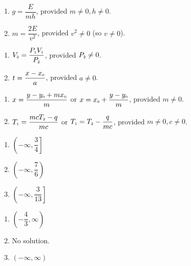\documentclass[11pt]{article}
\theoremstyle{definition}  %
\newcounter{HW}
\begin{document}
\begin{multicols}{2}
\begin{enumerate}
\setcounter{enumi}{\value{HW}}
\item $g = \dfrac{E}{mh}$, provided $m \neq 0, h \neq 0$.
\item $m = \dfrac{2E}{v^2}$, provided $v^2 \neq 0$ (so $v \neq 0$).
\setcounter{HW}{\value{enumi}}
\end{enumerate}
\end{multicols}


\begin{multicols}{2}
\begin{enumerate}
\setcounter{enumi}{\value{HW}}
\item $V_{\text{\tiny $2$}} = \dfrac{P_{\text{\tiny $1$}}V_{\text{\tiny $1$}}}{P_{\text{\tiny $2$}}}$, provided $P_{\text{\tiny $2$}} \neq 0$. 
\item $t = \dfrac{x - x_{\text{\tiny $0$}}}{a}$, provided $a \neq 0$.
\setcounter{HW}{\value{enumi}}
\end{enumerate}
\end{multicols}


\begin{enumerate}
\setcounter{enumi}{\value{HW}}
\item $x = \dfrac{y-y_{\text{\tiny $0$}} + mx_{\text{\tiny $0$}}}{m}$ or $x = x_{\text{\tiny $0$}} + \dfrac{y-y_{\text{\tiny $0$}}}{m}$, provided $m \neq 0$. 
\item $T_{\text{\tiny $1$}} = \dfrac{mcT_{\text{\tiny $2$}} - q}{mc}$ or $T_{\text{\tiny $1$}} = T_{\text{\tiny $2$}} - \dfrac{q}{mc} $, provided $m \neq 0, c \neq 0$.  
\setcounter{HW}{\value{enumi}}
\end{enumerate}


\begin{multicols}{3}
\begin{enumerate}
\setcounter{enumi}{\value{HW}}
\addtocounter{enumi}{1}
\item $\left(-\infty, \dfrac{3}{4}\right]$
\item $\left(-\infty, \dfrac{7}{6} \right)$  
\item  $\left( -\infty,  \dfrac{3}{13}\right]$

\setcounter{HW}{\value{enumi}}
\end{enumerate}
\end{multicols}

\begin{multicols}{3}
\begin{enumerate}
\setcounter{enumi}{\value{HW}}

\item $\left(-\dfrac{4}{3}, \infty\right)$
\item No solution.
\item $(-\infty, \infty)$

\setcounter{HW}{\value{enumi}}
\end{enumerate}
\end{multicols}
\end{document}
